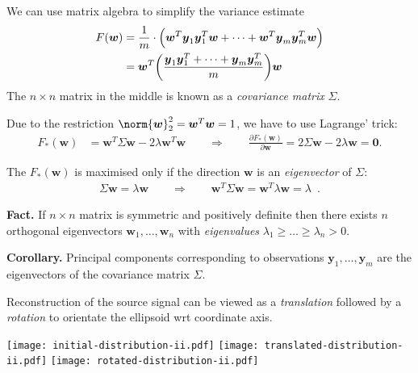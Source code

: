 \documentclass[landscape,footrule]{foils}
\renewcommand{\vec}[1]{\boldsymbol{#1}}
\begin{document}

We can use matrix algebra to simplify the variance estimate
\begin{align*}
F(\vec{w})&=\frac{1}{m}\cdot\Bigl(\vec{w}^T\vec{y}_1\vec{y}_1^T\vec{w}+\cdots+ \vec{w}^T\vec{y}_m\vec{y}_m^T\vec{w}\Bigr)\\
&=\vec{w}^T\biggl(\frac{\vec{y}_1\vec{y}_1^T+\cdots+\vec{y}_m\vec{y}_m^T}{m}\biggl)\vec{w}
\end{align*}
The $n\times n$ matrix in the middle is known as a \emph{covariance matrix} $\Sigma$.
\vspace*{1cm}

Due to the restriction $\norm{\vec{w}}_2^2=\vec{w}^T\vec{w}=1$, we have to use Lagrange' trick: 
\begin{align*}
F_*(\vec{w})&=\vec{w}^T\Sigma\vec{w}-2\lambda\vec{w}^T\vec{w}
\qquad \Rightarrow\qquad 
\frac{\partial F_*(\vec{w})}{\partial \vec{w}}=2\Sigma\vec{w}- 2\lambda\vec{w}=\vec{0}.
\end{align*}


The $F_*(\vec{w})$ is maximised only if the direction $\vec{w}$ is an \emph{eigenvector} of $\Sigma$:
\begin{align*}
\Sigma\vec{w}=\lambda\vec{w}\qquad\Rightarrow\qquad \vec{w}^T\Sigma\vec{w}=\vec{w}^T\lambda\vec{w}=\lambda\enspace.
\end{align*}

\textbf{Fact.} If $n\times n$ matrix is symmetric and positively definite then there exists 
$n$ orthogonal eigenvectors $\vec{w}_1,\ldots,\vec{w}_n$ with \emph{eigenvalues} $\lambda_1\geq \ldots\geq\lambda_n>0$. \vspace*{0.5cm}

\textbf{Corollary.} Principal components corresponding to observations $\vec{y}_1,\ldots,\vec{y}_m$ are the eigenvectors of the covariance matrix $\Sigma$. 



Reconstruction of the source signal can be viewed as a \emph{translation} followed by a \emph{rotation} to orientate the ellipsoid wrt coordinate axis.

\begin{center}
\texttt{[image: initial-distribution-ii.pdf]}
\texttt{[image: translated-distribution-ii.pdf]}
\texttt{[image: rotated-distribution-ii.pdf]}
\end{center}\vspace*{-1cm}
\end{document}
